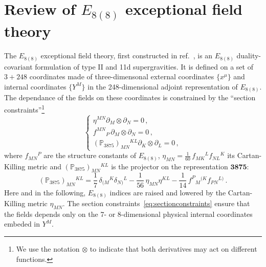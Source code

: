 \documentclass[a4paper, 11pt]{article}
\numberwithin{equation}{section}
\newcommand{\EE}{\ensuremath{E_{8(8)}}\xspace}
\newcommand{\+}{\oplus}
\begin{document}
\section{Review of \texorpdfstring{\EE}{E8(8)} exceptional field theory} \label{s:Review}

The \EE exceptional field theory, first constructed in ref.~\cite{Hohm:2014fxa}, is an \EE duality-covariant formulation of type II and 11d supergravities. It is defined on a set of $3+248$ coordinates made of three-dimensonal external coordinates $\{x^{\mu}\}$ and internal coordinates $\{Y^{M}\}$ in the 248-dimensional adjoint representation of \EE. The dependance of the fields on these coordinates is constrained by the ``section constraints''\footnote{We use the notation $\otimes$ to indicate that both derivatives may act on different functions.}
\begin{equation} \label{eq:sectionconstraints}
	\begin{cases}
		\eta^{MN}\partial_{M}\otimes\partial_{N} = 0\,,\\
		f^{MN}{}_{P}\,\partial_{M}\otimes\partial_{N} = 0\,,\\
		(\mathbb{P}_{3875})_{MN}{}^{KL}\partial_{K}\otimes\partial_{L} = 0\,,
	\end{cases}
\end{equation}
where $f_{MN}{}^{P}$ are the structure constants of \EE, $\eta_{MN} = \tfrac{1}{60}\,f_{MK}{}^{L}f_{NL}{}^{K}$ its Cartan-Killing metric and $(\mathbb{P}_{3875})_{MN}{}^{KL}$ is the projector on the representation $\mathbf{3875}$:
\begin{equation}
	(\mathbb{P}_{3875})_{MN}{}^{KL} = \frac{1}{7}\, \delta_{(M}{}^{K}\delta_{N)}{}^{L}-\frac{1}{56}\,\eta_{MN}\eta^{KL}-\frac{1}{14}\,f^{P}{}_{M}{}^{(K}f_{PN}{}^{L)}\,.
\end{equation}
Here and in the following, \EE indices are raised and lowered by the Cartan-Killing metric $\eta_{MN}$. The section constraints~\eqref{eq:sectionconstraints} ensure that the fields depends only on the 7- or 8-dimensional physical internal coordinates embeded in $Y^{M}$.
\end{document}
